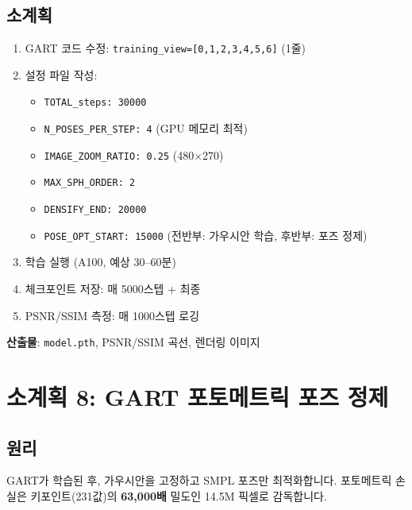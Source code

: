 \documentclass[11pt, a4paper]{report}
\begin{document}
\subsection{소계획}
\begin{pipelinebox}[title={SP-7: GART 7-View 30,000스텝 학습}]
\begin{enumerate}
\item GART 코드 수정: \texttt{training\_view=[0,1,2,3,4,5,6]} (1줄)
\item 설정 파일 작성:
  \begin{itemize}
  \item \texttt{TOTAL\_steps: 30000}
  \item \texttt{N\_POSES\_PER\_STEP: 4} (GPU 메모리 최적)
  \item \texttt{IMAGE\_ZOOM\_RATIO: 0.25} (480$\times$270)
  \item \texttt{MAX\_SPH\_ORDER: 2}
  \item \texttt{DENSIFY\_END: 20000}
  \item \texttt{POSE\_OPT\_START: 15000} (전반부: 가우시안 학습, 후반부: 포즈 정제)
  \end{itemize}
\item 학습 실행 (A100, 예상 30--60분)
\item 체크포인트 저장: 매 5000스텝 + 최종
\item PSNR/SSIM 측정: 매 1000스텝 로깅
\end{enumerate}
\textbf{산출물}: \texttt{model.pth}, PSNR/SSIM 곡선, 렌더링 이미지
\end{pipelinebox}


\section{소계획 8: GART 포토메트릭 포즈 정제}
\label{sec:sp8}

\subsection{원리}
GART가 학습된 후, 가우시안을 고정하고 SMPL 포즈만 최적화합니다.
포토메트릭 손실은 키포인트(231값)의 \textbf{63,000배} 밀도인 14.5M 픽셀로 감독합니다.
\end{document}
